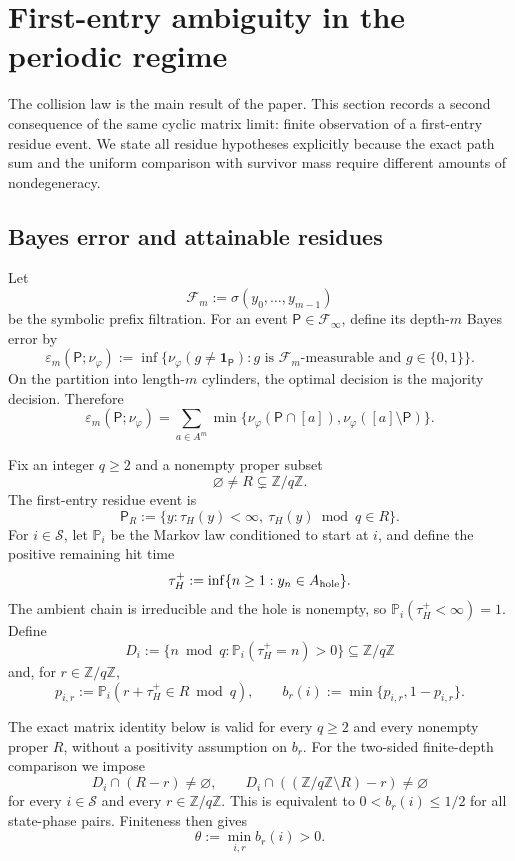 \section{First-entry ambiguity in the periodic regime}
\label{sec:open-system}

The collision law is the main result of the paper.  This section records
a second consequence of the same cyclic matrix limit: finite observation
of a first-entry residue event.  We state all residue hypotheses
explicitly because the exact path sum and the uniform comparison with
survivor mass require different amounts of nondegeneracy.

\subsection{Bayes error and attainable residues}

Let
\[
  \mathcal F_m:=\sigma(y_0,\ldots,y_{m-1})
\]
be the symbolic prefix filtration.  For an event
\(\mathsf P\in\mathcal F_\infty\), define its depth-\(m\) Bayes error by
\[
  \varepsilon_m(\mathsf P;\nu_\varphi)
  :=\inf\{\nu_\varphi(g\neq\mathbf1_{\mathsf P}):
      g\text{ is }\mathcal F_m\text{-measurable and }g\in\{0,1\}\}.
\]
On the partition into length-\(m\) cylinders, the optimal decision is
the majority decision.  Therefore
\begin{equation}
  \varepsilon_m(\mathsf P;\nu_\varphi)
  =\sum_{a\in A^m}
   \min\{\nu_\varphi(\mathsf P\cap[a]),
          \nu_\varphi([a]\setminus\mathsf P)\}.
  \label{eq:bayes-cylinder}
\end{equation}

Fix an integer \(q\geq2\) and a nonempty proper subset
\[
  \varnothing\neq R\subsetneq\mathbb Z/q\mathbb Z.
\]
The first-entry residue event is
\[
  \mathsf P_R
  :=\{y:\tau_H(y)<\infty,\ \tau_H(y)\bmod q\in R\}.
\]
For \(i\in\mathcal S\), let \(\mathbb P_i\) be the Markov law
conditioned to start at \(i\), and define the positive remaining hit
time
\[
  \tau_H^+:=\inf\{n\geq1:y_n\in A_{\rm hole}\}.
\]
The ambient chain is irreducible and the hole is nonempty, so
\(\mathbb P_i(\tau_H^+<\infty)=1\).  Define
\[
  D_i:=\{n\bmod q:\mathbb P_i(\tau_H^+=n)>0\}
  \subseteq\mathbb Z/q\mathbb Z
\]
and, for \(r\in\mathbb Z/q\mathbb Z\),
\[
  p_{i,r}:=\mathbb P_i(r+\tau_H^+\in R\bmod q),
  \qquad
  b_r(i):=\min\{p_{i,r},1-p_{i,r}\}.
\]

The exact matrix identity below is valid for every \(q\geq2\) and every
nonempty proper \(R\), without a positivity assumption on \(b_r\).  For
the two-sided finite-depth comparison we impose
\begin{equation}
  D_i\cap(R-r)\neq\varnothing,
  \qquad
  D_i\cap((\mathbb Z/q\mathbb Z\setminus R)-r)\neq\varnothing
  \label{eq:residue-nondegeneracy}
\end{equation}
for every \(i\in\mathcal S\) and every
\(r\in\mathbb Z/q\mathbb Z\).  This is equivalent to
\(0<b_r(i)\leq1/2\) for all state-phase pairs.  Finiteness then gives
\[
  \theta:=\min_{i,r}b_r(i)>0.
\]


